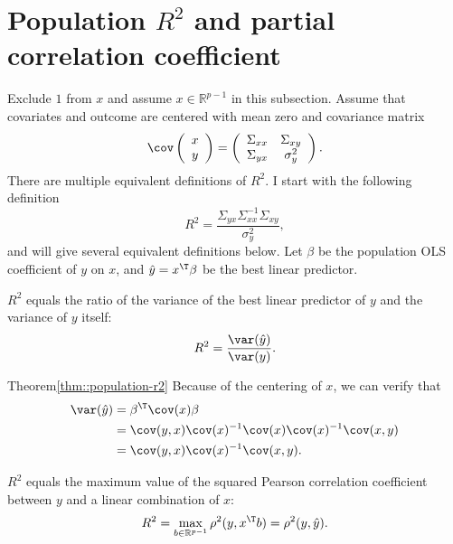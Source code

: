 \section{Population $R^{2}$ and partial correlation coefficient}


Exclude $1$ from $x $ and assume $ x \in \mathbb{R}^{p-1}$ in this subsection. 
Assume that covariates and outcome are centered with mean zero and covariance matrix
\[
\cov\left(\begin{array}{c}
x\\
y
\end{array}\right)=\left(\begin{array}{cc}
\Sigma_{xx} & \Sigma_{xy}\\
\Sigma_{yx} & \sigma_{y}^{2}
\end{array}\right).
\]
There are multiple equivalent definitions of $R^2$. I start with the following definition
\[
R^{2}=\frac{\Sigma_{yx}\Sigma_{xx}^{-1}\Sigma_{xy}}{\sigma_{y}^{2}},
\]
and will give several equivalent definitions below. 
Let $  \beta $ be the
population OLS coefficient of $y$ on $x$, and $\hat{y}=   x^{\T}\beta$ be the best
linear predictor. 




\begin{theorem}\label{thm::population-r2}
$R^{2}$ equals the ratio of the variance of the best linear predictor
of $y$ and the variance of $y$ itself:
\[
R^{2}=\frac{\var(\hat{y})}{\var(y)}.
\]
\end{theorem}


\begin{myproof}{Theorem}{\ref{thm::population-r2}}
Because of the centering of $x$, we can verify that 
\begin{align*}
\var(  \hat{y}  ) & =\beta^{\T}\cov(x)\beta\\
 & =\cov(y,x)\cov(x)^{-1}\cov(x)\cov(x)^{-1}\cov(x,y)\\
 & =\cov(y,x)\cov(x)^{-1}\cov(x,y).
\end{align*}
\end{myproof}



\begin{theorem}\label{thm::r2-equivalent-form}
$R^{2}$ equals the maximum value of the squared Pearson correlation
coefficient between $y$ and a linear combination of $x$:
\[
R^{2}=\max_{b   \in \mathbb{R}^{p-1}  }\rho ^{2}(y,x^{\T}b)=\rho ^{2}(y,\hat{y}).
\]
\end{theorem}



